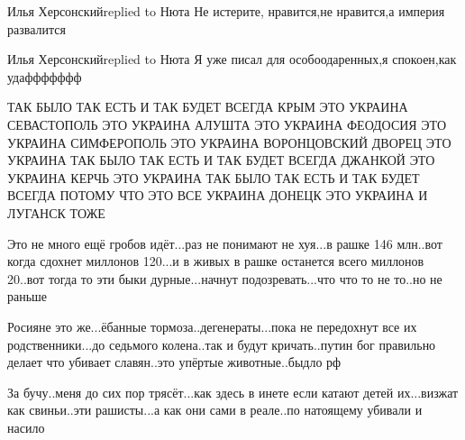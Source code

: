 


Илья Херсонскийreplied to Нюта
Не истерите, нравится,не нравится,а империя развалится

Илья Херсонскийreplied to Нюта
Я уже писал для особоодаренных,я спокоен,как удаффффффф

ТАК БЫЛО ТАК ЕСТЬ И ТАК БУДЕТ ВСЕГДА КРЫМ ЭТО УКРАИНА СЕВАСТОПОЛЬ ЭТО УКРАИНА
АЛУШТА ЭТО УКРАИНА ФЕОДОСИЯ ЭТО УКРАИНА СИМФЕРОПОЛЬ ЭТО УКРАИНА ВОРОНЦОВСКИЙ
ДВОРЕЦ ЭТО УКРАИНА ТАК БЫЛО ТАК ЕСТЬ И ТАК БУДЕТ ВСЕГДА ДЖАНКОЙ ЭТО УКРАИНА
КЕРЧЬ ЭТО УКРАИНА ТАК БЫЛО ТАК ЕСТЬ И ТАК БУДЕТ ВСЕГДА ПОТОМУ ЧТО ЭТО ВСЕ
УКРАИНА ДОНЕЦК ЭТО УКРАИНА И ЛУГАНСК ТОЖЕ

Это не много ещё гробов идёт...раз не понимают не хуя...в рашке 146 млн..вот
когда сдохнет миллонов 120...и в живых в рашке останется всего миллонов 20..вот
тогда то эти быки дурные...начнут подозревать...что что то не то..но не раньше

Росияне это же...ёбанные тормоза..дегенераты...пока не передохнут все их
родственники...до седьмого колена..так и будут кричать..путин бог правильно
делает что убивает славян..это упёртые животные..быдло рф

За бучу..меня до сих пор трясёт...как здесь в инете если катают детей
их...визжат как свиньи..эти рашисты...а как они сами в реале..по натоящему
убивали и насило







